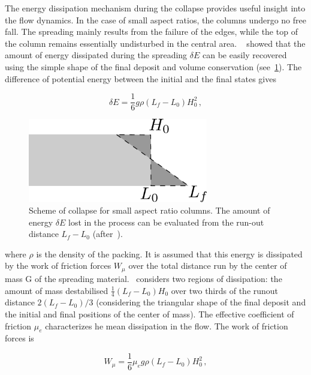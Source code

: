 The energy dissipation mechanism during the collapse provides useful insight 
into the flow dynamics. In the case of small aspect ratios, the columns undergo 
no free fall. The spreading mainly results from the failure of the edges, while 
the top of the column remains essentially undisturbed in the central area. 
~\citet{Staron2007a} showed that the amount of energy dissipated during the 
spreading $\delta E$ can be easily recovered using the simple shape of the 
final deposit and volume conservation (see~\cref{fig:volume_conservation}). The 
difference of potential energy between the initial and the final states gives

\begin{equation}
\delta E = \frac{1}{6} g \rho (L_f - L_0) H_0^2 \,,
\end{equation}

\begin{figure}
\centering
\includegraphics[width=0.7\textwidth]{volume_conservation}
\caption{Scheme of collapse for small aspect ratio columns. The amount of 
energy $\delta E$ lost in the process can be evaluated
from the run-out distance $L_f - L_0$ (after~\citet{Staron2007a}).}
\label{fig:volume_conservation}
\end{figure}

where $\rho$ is the density of the packing. It is assumed that this energy is 
dissipated by the work of friction forces $W_{\mu}$ over the total distance run 
by the center of mass G of the spreading material.~\citet{Staron2006} considers 
two regions of dissipation: the amount of mass destabilised $\frac{1}{4}(L_f - 
L_0) H_0$ over two thirds of the runout distance $2(L_f - L_0) / 3$ (considering
the triangular shape of the final deposit and the initial and final positions 
of the center of mass). The effective coefficient of friction $\mu_e$ 
characterizes he mean dissipation in the flow. The work of friction forces is 

\begin{equation}
W_{\mu} = \frac{1}{6} \mu_e g \rho (L_f - L_0) H_0^2 \,,
\end{equation}


